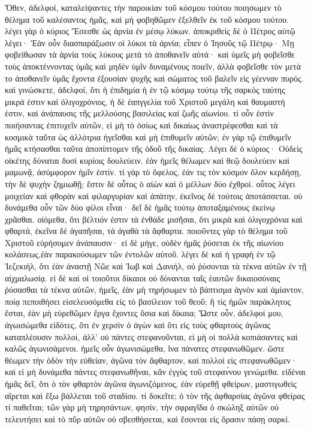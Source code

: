 Ὅθεν, ἀδελφοί, καταλείψαντες τὴν παροικίαν τοῦ κόσμου τούτου ποιησωμεν τὸ θέλημα τοῦ καλέσαντος ἡμᾶς, καὶ μὴ φοβηθῶμεν ἐξελθεῖν ἐκ τοῦ κόσμου τούτου. λέγει γὰρ ὁ κύριος Ἔσεσθε ὡς ἀρνία ἐν μέσῳ λύκων. ἀποκριθεὶς δὲ ὁ Πέτρος αὐτῷ λέγει· Ἐὰν οὖν διασπαράξωσιν οἱ λύκοι τὰ ἀρνία; εἶπεν ὁ Ἰησοῦς τῷ Πέτρῳ· Μῃ φοβείθωσαν τὰ ἀρνία τοὺς λύκους μετὰ τὸ ἀποθανεῖν αὐτά· καὶ ὑμεῖς μὴ φοβεῖσθε τοὺς ἀποκτέννοντας ὑμᾶς καὶ μηδὲν ὑμῖν δυναμένους ποιεῖν, ἀλλὰ φοβεῖσθε τὸν μετὰ το ἀποθανεῖν ὑμᾶς ἔχοντα ἐξουσίαν ψυχῆς καὶ σώματος τοῦ βαλεῖν εἰς γέενναν πυρός. καὶ γινώσκετε, ἀδελφοί, ὅτι ἡ ἐπιδημία ἡ ἐν τῷ κόσμῳ τούτῳ τῆς σαρκὸς ταύτης μικρά ἐστιν καὶ ὀλιγοχρόνιος, ἡ δὲ ἐαπγγελία τοῦ Χριστοῦ μεγάλη καὶ θαυμαστή ἐστιν, καὶ ἀνάπαυσις τῆς μελλούσης βασιλείας καὶ ζωῆς αἰωνίου. τί οὖν ἐστὶν ποιήσαντας ἐπιτυχεῖν αὐτῶν, εἰ μὴ τὸ ὁσίως καὶ δικαίως ἀναστρέφεσθαι καὶ τὰ κοσμικὰ ταῦτα ὡς ἀλλότρια ἡγεῖσθαι καὶ μὴ ἐπιθυμεῖν αὐτῶν; ἐν γὰρ τῷ ἐπιθυμεῖν ἡμᾶς κτήσασθαι ταῦτα ἀποπίπτομεν τῆς ὁδοῦ τῆς δικαίας.
Λέγει δὲ ὁ κύριος· Οὐδεὶς οἰκέτης δύναται δυσὶ κυρίοις δουλεύειν. ἐὰν ἡμεῖς θέλωμεν καὶ θεῷ δουλεύειν καὶ μαμωνᾷ, ἀσύμφορον ἡμῖν ἐστίν. τί γὰρ τὸ ὄφελος, ἐάν τις τὸν κόσμον ὅλον κερδήσῃ, τὴν δὲ ψυχὴν ζημιωθῇ; ἔστιν δὲ οὗτος ὁ αἰὼν καὶ ὁ μέλλων δύο ἐχθροί. οὗτος λέγει μοιχείαν καὶ φθορὰν καὶ φιλαργυρίαν καὶ ἀπάτην, ἐκεῖνος δὲ τούτοις ἀποτάσσεται. οὐ δυνάμεθα οὖν τῶν δύο φίλοι εἶναι· δεῖ δὲ ἡμᾶς τούτῳ ἀποταξαμένους ἐκείνῳ χρᾶσθαι. οἰόμεθα, ὅτι βέλτιόν ἐστιν τὰ ἐνθάδε μισῆσαι, ὅτι μικρὰ καὶ ὀλιγοχρόνια καὶ φθαρτά, ἐκεῖνα δὲ ἀγαπῆσαι, τὰ ἀγαθὰ τὰ ἄφθαρτα. ποιοῦντες γὰρ τὸ θέλημα τοῦ Χριστοῦ εὑρήσομεν ἀνάπαυσιν· εἰ δὲ μήγε, οὐδὲν ἡμᾶς ῥύσεται ἐκ τῆς αἰωνίου κολάσεως,ἐὰν παρακούσωμεν τῶν ἐντολῶν αὐτοῦ. λέγει δὲ καὶ ἡ γραφὴ ἐν τῷ Ἰεζεκιήλ, ὅτι ἐὰν ἀναστῇ Νῶε καὶ Ἰωβ καὶ Δανιήλ, οὐ ῥύσονται τὰ τέκνα αὐτῶν ἐν τῇ αἰχμαλωσίᾳ. εἰ δὲ καὶ οἱ τοιοῦτοι δίκαιοι οὐ δύνανται ταῖς ἑαυτῶν δικαιοσύναις ῥύσασθαι τὰ τέκνα αὐτῶν, ἡμεῖς, ἐὰν μὴ τηρήσωμεν τὸ βάπτισμα ἁγνὸν καὶ ἀμίαντον, ποίᾳ πεποιθήσει εἰσελευσόμεθα εἰς τὸ βασίλειον τοῦ θεοῦ; ἢ τίς ἡμῶν παράκλητος ἔσται, ἐὰν μὴ εὑρεθῶμεν ἔργα ἔχοντες ὅσια καὶ δίκαια;
Ὥστε οὖν, ἀδελφοί μου, ἀγωισώμεθα εἰδότες, ὅτι ἐν χερσὶν ὁ ἀγὼν καὶ ὅτι εἰς τοὺς φθαρτοὺς ἀγῶνας καταπλέουσιν πολλοί, ἀλλ’ οὐ πάντες στεφανοῦνται, εἰ μὴ οἱ πολλὰ κοπιάσαντες καὶ καλῶς ἀγωνισάμενοι. ἡμεῖς οὖν ἀγωνισώμεθα, ἵνα πάνατες στεφανωθῶμεν. ὥστε θέωμεν τὴν ὁδὸν τὴν εὐθείαν, ἀγῶνα τὸν ἄφθαρτον, καὶ πολλοὶ εἰς στεφανωθῶμεν· καὶ εἰ μὴ δυνάμεθα πάντες στεφανωθῆναι, κἂν ἐγγὺς τοῦ στεφαν́νου γενώμεθα. εἰδέναι ἡμᾶς δεῖ, ὅτι ὁ τὸν φθαρτὸν ἀγῶνα ἀγωνιζόμενος, ἐὰν εὑρεθῇ φθείρων, μαστιγωθεὶς αἴρεται καὶ ἔξω βάλλεται τοῦ σταδίου. τί δοκεῖτε; ὁ τὸν τῆς ἀφθαρσίας ἀγῶνα φθείρας τί παθεῖται; τῶν γὰρ μὴ τηρησάντων, φησίν, τὴν σφραγῖδα ὁ σκώληξ αὐτῶν οὐ τελευτήσει καὶ τὸ πῦρ αὐτῶν οὐ σβεσθήσεται, καὶ ἔσονται εἰς ὅρασιν πάσῃ σαρκί.
